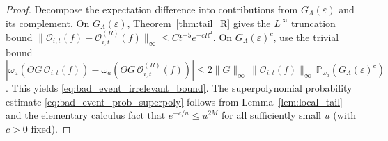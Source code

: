 \begin{proof}
Decompose the expectation difference into contributions from $G_{\Lambda}(\varepsilon)$ and its complement.
On $G_{\Lambda}(\varepsilon)$, Theorem~\ref{thm:tail_R} gives the $L^\infty$ truncation bound
$\|\mathcal O_{i,t}(f)-\mathcal O^{(R)}_{i,t}(f)\|_\infty\le C t^{-5}e^{-cR^2}$.
On $G_{\Lambda}(\varepsilon)^c$, use the trivial bound
$|\omega_a(\Theta G\,\mathcal O_{i,t}(f)) - \omega_a(\Theta G\,\mathcal O^{(R)}_{i,t}(f))|
\le 2\|G\|_\infty\,\|\mathcal O_{i,t}(f)\|_\infty\,\mathbb P_{\omega_a}(G_{\Lambda}(\varepsilon)^c)$.
This yields \eqref{eq:bad_event_irrelevant_bound}.
The superpolynomial probability estimate \eqref{eq:bad_event_prob_superpoly} follows from Lemma~\ref{lem:local_tail} and the elementary calculus fact that $e^{-c/u}\le u^{2M}$ for all sufficiently small $u$ (with $c>0$ fixed).
\end{proof}

